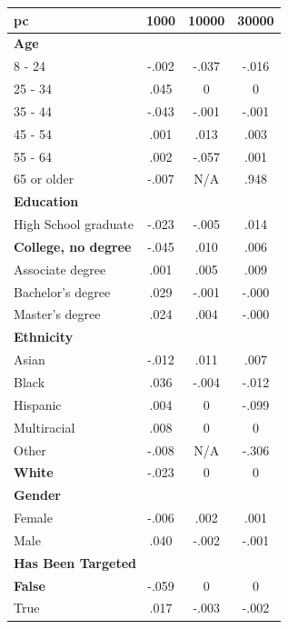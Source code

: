 \documentclass{article} %
\theoremstyle{definition}
\theoremstyle{plain}
\begin{document}
\begin{table}[t]
	\scriptsize
	\centering
	\begin{tabular}{l c c c}
		\toprule
		\textbf{\ac{pc}} & \textbf{1000} & \textbf{10000} & \textbf{30000} \\
		\midrule
		\multicolumn{4}{l}{\textbf{Age}} \\
		\midrule
		8 - 24 & -.002 & -.037 & -.016 \\
		25 - 34 & .045 & 0 & 0 \\
		35 - 44 & -.043 & -.001 & -.001 \\
		45 - 54 & .001 & .013 & .003 \\
		55 - 64 & .002 & -.057 & .001 \\
		65 or older & -.007 & N/A & .948 \\
		\midrule
		
		\multicolumn{4}{l}{\textbf{Education}} \\
		\midrule
		High School graduate & -.023 & -.005 & .014 \\
		\textbf{College, no degree} & -.045 & .010 & .006 \\
		Associate degree & .001 & .005 & .009 \\
		Bachelor's degree & .029 & -.001 & -.000 \\
		Master's degree & .024 & .004 & -.000 \\
		\midrule
		
		\multicolumn{4}{l}{\textbf{Ethnicity}} \\
		\midrule
		Asian & -.012 & .011 & .007 \\
		Black & .036 & -.004 & -.012 \\
		Hispanic & .004 & 0 & -.099 \\
		Multiracial & .008 & 0 & 0 \\
		Other & -.008 & N/A & -.306 \\
		\textbf{White} & -.023 & 0 & 0 \\
		\midrule
		
		\multicolumn{4}{l}{\textbf{Gender}} \\
		\midrule
		Female & -.006 & .002 & .001 \\
		Male & .040 & -.002 & -.001 \\
		\midrule
		
		\multicolumn{4}{l}{\textbf{Has Been Targeted}} \\
		\midrule
		\textbf{False} & -.059 & 0 & 0 \\
		True & .017 & -.003 & -.002 \\
		\midrule
		

\end{tabular}
\end{table}
\end{document}
